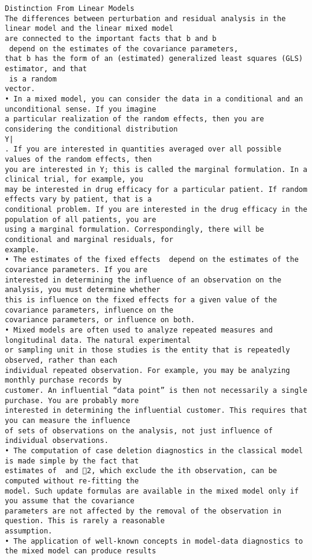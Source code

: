 \documentclass[]{article}
\begin{document}
\newpage
\begin{verbatim}
Distinction From Linear Models
The differences between perturbation and residual analysis in the linear model and the linear mixed model
are connected to the important facts that b and b
 depend on the estimates of the covariance parameters,
that b has the form of an (estimated) generalized least squares (GLS) estimator, and that 
 is a random
vector.
• In a mixed model, you can consider the data in a conditional and an unconditional sense. If you imagine
a particular realization of the random effects, then you are considering the conditional distribution
Y|
. If you are interested in quantities averaged over all possible values of the random effects, then
you are interested in Y; this is called the marginal formulation. In a clinical trial, for example, you
may be interested in drug efficacy for a particular patient. If random effects vary by patient, that is a
conditional problem. If you are interested in the drug efficacy in the population of all patients, you are
using a marginal formulation. Correspondingly, there will be conditional and marginal residuals, for
example.
• The estimates of the fixed effects  depend on the estimates of the covariance parameters. If you are
interested in determining the influence of an observation on the analysis, you must determine whether
this is influence on the fixed effects for a given value of the covariance parameters, influence on the
covariance parameters, or influence on both.
• Mixed models are often used to analyze repeated measures and longitudinal data. The natural experimental
or sampling unit in those studies is the entity that is repeatedly observed, rather than each
individual repeated observation. For example, you may be analyzing monthly purchase records by
customer. An influential “data point” is then not necessarily a single purchase. You are probably more
interested in determining the influential customer. This requires that you can measure the influence
of sets of observations on the analysis, not just influence of individual observations.
• The computation of case deletion diagnostics in the classical model is made simple by the fact that
estimates of  and 2, which exclude the ith observation, can be computed without re-fitting the
model. Such update formulas are available in the mixed model only if you assume that the covariance
parameters are not affected by the removal of the observation in question. This is rarely a reasonable
assumption.
• The application of well-known concepts in model-data diagnostics to the mixed model can produce results

\end{verbatim}
\end{document}
